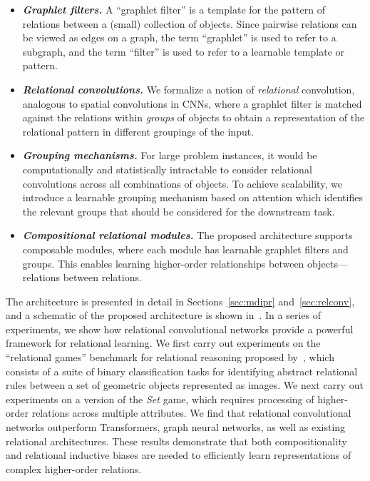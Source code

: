 \begin{itemize}%
    \item \textit{\bfseries Graphlet filters.} A ``graphlet filter'' is a template for the pattern of relations between a (small) collection of objects. 
    Since pairwise relations can be viewed as edges on a graph, the term ``graphlet'' is used to refer to a subgraph, and the term ``filter'' is used to refer to a learnable template or pattern.
    \item \textit{\bfseries Relational convolutions.} 
    We formalize a notion of \textit{relational} convolution, analogous to spatial convolutions in CNNs, where a graphlet filter is matched against the relations within \textit{groups} of objects to obtain a representation of the relational pattern in different groupings of the input.
    \item \textit{\bfseries Grouping mechanisms.} For large problem instances, it would be computationally and statistically intractable to consider relational convolutions across all combinations of objects. To achieve scalability, we introduce a learnable grouping mechanism based on attention which identifies the relevant groups that should be considered for the downstream task.
    \item \textit{\bfseries Compositional relational modules.} The proposed architecture supports composable modules, where each module has learnable graphlet filters and groups. This enables learning higher-order relationships between objects---relations between relations.
\end{itemize}


The architecture is presented in detail in Sections~\ref{sec:mdipr} and~\ref{sec:relconv}, and a schematic of the proposed architecture is shown in~. In a series of experiments, we show how relational convolutional networks provide a powerful framework
for relational learning. We first carry out experiments on the ``relational games'' benchmark for relational reasoning proposed by~\citet{shanahanExplicitlyRelationalNeural}, which consists of a suite of binary classification tasks for identifying abstract relational rules between a set of geometric objects represented as images. 
We next carry out experiments on a version of the \textit{Set} game, which requires processing of higher-order relations across multiple attributes. We find that relational convolutional networks outperform Transformers, graph neural networks, as well as existing relational architectures. These results demonstrate that both compositionality and relational inductive biases are needed to efficiently learn representations of complex higher-order relations.

